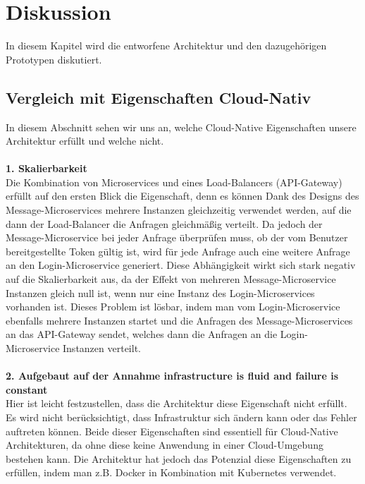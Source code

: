 \chapter{Diskussion}
In diesem Kapitel wird die entworfene Architektur und den dazugehörigen Prototypen diskutiert.

\section{Vergleich mit Eigenschaften Cloud-Nativ}
In diesem Abschnitt sehen wir uns an, welche Cloud-Native Eigenschaften unsere Architektur erfüllt und welche nicht.\\
\\
\textbf{1. Skalierbarkeit}\\
Die Kombination von Microservices und eines Load-Balancers (API-Gateway) erfüllt auf den ersten Blick die Eigenschaft, denn es können Dank des Designs des Message-Microservices mehrere Instanzen gleichzeitig verwendet werden, auf die dann der Load-Balancer die Anfragen gleichmäßig verteilt. Da jedoch der Message-Microservice bei jeder Anfrage überprüfen muss, ob der vom Benutzer bereitgestellte Token gültig ist, wird für jede Anfrage auch eine weitere Anfrage an den Login-Microservice generiert. Diese Abhängigkeit wirkt sich stark negativ auf die Skalierbarkeit aus, da der Effekt von mehreren Message-Microservice Instanzen gleich null ist, wenn nur eine Instanz des Login-Microservices vorhanden ist. Dieses Problem ist lösbar, indem man vom Login-Microservice ebenfalls mehrere Instanzen startet und die Anfragen des Message-Microservices an das API-Gateway sendet, welches dann die Anfragen an die Login-Microservice Instanzen verteilt.\\
\\
\textbf{2. Aufgebaut auf der Annahme \glqq infrastructure is fluid and failure is constant\grqq{}}\\
Hier ist leicht festzustellen, dass die Architektur diese Eigenschaft nicht erfüllt. Es wird nicht berücksichtigt, dass Infrastruktur sich ändern kann oder das Fehler auftreten können. Beide dieser Eigenschaften sind essentiell für Cloud-Native Architekturen, da ohne diese keine Anwendung in einer Cloud-Umgebung bestehen kann. Die Architektur hat jedoch das Potenzial diese Eigenschaften zu erfüllen, indem man z.B. Docker in Kombination mit Kubernetes verwendet.\\
\\
